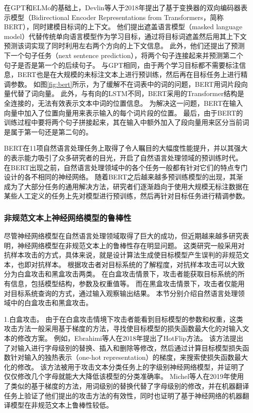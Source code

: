 在GPT和ELMo的基础上，Devlin等人于2018年提出了基于变换器的双向编码器表示模型（Bidirectional Encoder Representations from Transformers，简称BERT）\cite{devlin-etal-2018-bert}，同时建模目标词的上下文。
他们提出遮盖语言模型（masked language model）代替传统单向语言模型作为学习目标，通过将目标词遮盖然后用其上下文预测该词实现了同时利用左右两个方向的上下文信息。
此外，他们还提出了预测下一个句子任务（next sentence prediction），将两个句子连接起来并预测第二个句子是否是第一个的后续句子。
与GPT相同，由于两个学习目标都不需要标注信息，BERT也是在大规模的未标注文本上进行预训练，然后再在目标任务上进行精调参数。
如图\ref{fig:bert}所示，为了缓解不在词表中的词的问题，BERT用词片段向量代替了词向量。
此外，与有向的LSTM不同，BERT采用的Transformer结构是全连接的，无法有效表示文本中词的位置信息。
为解决这一问题，BERT在输入向量中加入了位置向量用来表示输入的每个词片段的位置。
最后，由于BERT的训练过程中要将两个句子拼接起来，其在输入中额外加入了段向量用来区分当前词是属于第一句还是第二句的。

BERT在11项自然语言处理任务上取得了令人瞩目的大幅度性能提升，并以其强大的表示能力吸引了众多研究者的目光，开启了自然语言处理领域的预训练时代。
在BERT出现之前，自然语言处理领域中的各个任务一般都有针对它们的特点专门设计的各不相同的神经网络。
随着BERT之后越来越多预训练模型的出现，其渐成为了大部分任务的通用解决方法，研究者们逐渐趋向于使用大规模无标注数据在某些人工定义的任务上先对模型进行预训练，然后再针对目标任务进行精调参数。

\subsubsection{非规范文本上神经网络模型的鲁棒性}

尽管神经网络模型在自然语言处理领域取得了巨大的成功，但近期越来越多研究表明，神经网络模型在非规范文本上的鲁棒性存在明显问题。
这类研究一般采用对抗样本攻击的方式，具体来说，就是设计算法生成使目标模型产生误判的非规范文本，也即对抗样本。
根据攻击者对目标系统的了解程度，对抗样本攻击可以大致分为白盒攻击和黑盒攻击两类。
在白盒攻击情景下，攻击者能获取目标系统的所有信息，包括模型结构，参数及权重值等。
而在黑盒攻击情景下，攻击者仅能用对目标系统查询的方式，通过输入观察输出结果。
本节分别介绍自然语言处理领域中的白盒攻击和黑盒攻击。

1.白盒攻击。
由于在白盒攻击情境下攻击者能看到目标模型的参数和权重，这类攻击方法一般采用基于梯度的方法，寻找使目标模型的损失函数最大化的对输入文本的修改方案。
例如，Ebrahimi等人在2018年提出了HotFlip方法。\cite{ebrahimi-etal-2018-hotflip}
该方法提出了对输入进行字母级别的替换、插入和删除等修改，然后通过计算目标模型损失函数针对输入的独热表示（one-hot representation）的梯度，来搜索使损失函数最大化的修改。
该方法被用于攻击文本分类任务上的字级别神经网络模型，并证明了仅仅修改几个字母就能大大降低该模型的分类准确率。
Michel等人在2019年使用了类似的基于梯度的方法\cite{michel-etal-2019-evaluation}，用词级别的替换代替了字母级别的修改，并在机器翻译任务上验证了他们提出的攻击方法的有效性，同时也证明了基于神经网络的机器翻译模型在非规范文本上鲁棒性较低。


